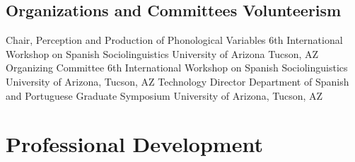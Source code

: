\documentclass[11pt,letterpaper]{moderncv}
\begin{document}
\subsection{Organizations and Committees Volunteerism}
        {Chair, Perception and Production of Phonological Variables}
        {6th International Workshop on Spanish Sociolinguistics}
        {University of Arizona}
        {Tucson, AZ}
        {}
        {Organizing Committee}
        {6th International Workshop on Spanish Sociolinguistics}
        {}
        {}
        {University of Arizona, Tucson, AZ}
        {Technology Director}
        {Department of Spanish and Portuguese Graduate Symposium}
        {}
        {}
        {University of Arizona, Tucson, AZ}






\section{Professional Development}
\end{document}
